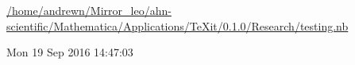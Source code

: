 \documentclass[a4paper,11pt]{article}
\begin{document}
\noindent
{\small\url{/home/andrewn/Mirror_leo/ahn-scientific/Mathematica/Applications/TeXit/0.1.0/Research/testing.nb}}

\medskip
\noindent
Mon 19 Sep 2016 14:47:03

\medskip
\end{document}
